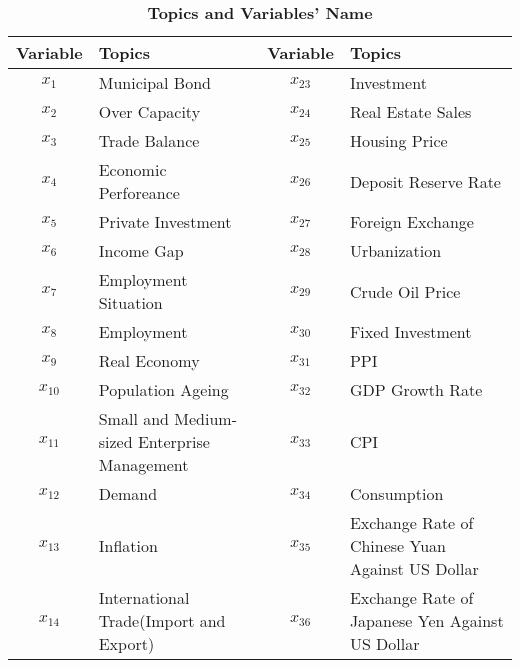 \documentclass[10pt]{article}
\begin{document}
	\begin{table}[ht!]
	\begin{center}
	\caption{\label{Topics1}\bf{Topics and Variables' Name}}
	\begin{tabular}{cp{5.5cm}|cp{5.5cm}}

\hline							
Variable	&	Topics	                                                                  &	Variable	&	Topics	\\
\hline							
$x_1$	&	Municipal Bond	                                                          &	$x_{23}$	&	Investment	\\
$x_2$	&	Over Capacity	                                                          &	$x_{24}$	&	Real Estate Sales	\\
$x_3$	&	Trade Balance	                                                          &	$x_{25}$	&	Housing Price	\\
$x_4$	&	Economic Perforeance                                               &	$x_{26}$	&	Deposit Reserve Rate	\\
$x_5$       &	Private Investment	                                                  &	$x_{27}$	&	Foreign Exchange	\\
$x_6$	&	Income Gap	                                                           &	$x_{28}$	&	Urbanization	\\
$x_7$	&	Employment Situation	                                          &	$x_{29}$	&	Crude Oil Price	\\
$x_8$	&	Employment	                                                           &	$x_{30}$   &	Fixed Investment	\\
$x_9$	&	Real Economy	                                                           &	$x_{31}$	&	PPI	\\
$x_{10}$	&	Population Ageing	                                                   &	$x_{32}$	&	GDP Growth Rate	\\
$x_{11}$	&	Small and Medium-sized Enterprise Management	&	$x_{33}$	&	CPI	\\
$x_{12}$	&	Demand	                                                                    &	$x_{34}$	&	Consumption	\\
$x_{13}$	&	Inflation	                                                                    &	$x_{35}$	&	Exchange Rate of Chinese Yuan Against US Dollar 	\\
$x_{14}$	&	International Trade(Import and Export)	                  &	$x_{36}$	&	Exchange Rate of Japanese Yen Against US Dollar 	\\

\end{tabular}
\end{center}
\end{table}
\end{document}
